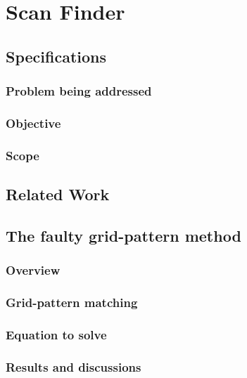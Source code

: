 \chapter{Scan Finder}
\label{ch:scanfinder}

\section{Specifications}


\subsection{Problem being addressed}


\subsection{Objective}


\subsection{Scope}



\section{Related Work}



\section{The faulty grid-pattern method}


\subsection{Overview}


\subsection{Grid-pattern matching}


\subsection{Equation to solve}


\subsection{Results and discussions}



